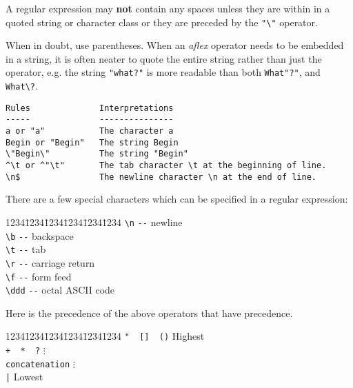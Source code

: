 \mysk
A regular expression may {\bf not} contain any spaces
unless they are within in a quoted string or character class 
or they are preceded by the \verb|"\"| operator. 

\mysk
When in doubt, use parentheses.  When an {\sl aflex} operator needs to be 
embedded in a string, it is often neater to quote the entire string rather 
than just the operator, e.g. the string \verb|"what?"| is more readable 
than both \verb|What"?"|, and \verb|What\?|.

\small
\begin{verbatim}
Rules              Interpretations
-----              ---------------
a or "a"           The character a
Begin or "Begin"   The string Begin
\"Begin\"          The string "Begin"
^\t or ^"\t"       The tab character \t at the beginning of line.
\n$                The newline character \n at the end of line.
\end{verbatim}
\normalsize

There are a few special characters which can be specified in a regular
expression:
\begin{tabbing}
1234\=1234\=1234\=1234\=1234\=1234 \kill
  \>\verb|\n|     \>\>\verb|--| newline \\
  \>\verb|\b|     \>\>\verb|--| backspace \\
  \>\verb|\t|     \>\>\verb|--| tab \\
  \>\verb|\r|     \>\>\verb|--| carriage return \\
  \>\verb|\f|     \>\>\verb|--| form feed \\
  \>\verb|\ddd|   \>\>\verb|--| octal ASCII code \\
\end{tabbing}
Here is the precedence of the above  operators  that  have  precedence. 
\begin{tabbing}
1234\=1234\=1234\=1234\=1234\=1234 \kill
  \>\verb|"  []  ()|            \>\>\>\>Highest \\
  \>\verb|+  *  ?|		\>\>\>\>\hspace{0.5cm}$\vdots$ \\
  \>\verb|concatenation|	\>\>\>\>\hspace{0.5cm}$\vdots$ \\
  \>\verb"|"                    \>\>\>\>Lowest \\
\end{tabbing}

